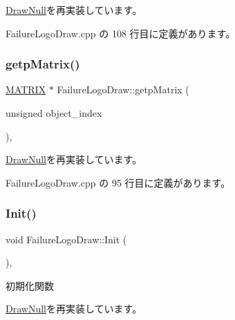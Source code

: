 \mbox{\hyperlink{class_draw_null_aa07d7e89e723b68ec257da0f63d43f70}{Draw\+Null}}を再実装しています。



 Failure\+Logo\+Draw.\+cpp の 108 行目に定義があります。

\mbox{\label{class_failure_logo_draw_a6e6fb80dc21af9318d659bc3fa71c0b5}} 
\subsubsection{\texorpdfstring{getp\+Matrix()}{getpMatrix()}}
{\footnotesize\ttfamily \mbox{\hyperlink{_vector3_d_8h_a032295cd9fb1b711757c90667278e744}{M\+A\+T\+R\+IX}} $\ast$ Failure\+Logo\+Draw\+::getp\+Matrix (\begin{DoxyParamCaption}\item[{unsigned}]{object\+\_\+index }\end{DoxyParamCaption})\hspace{0.3cm}{\ttfamily [override]}, {\ttfamily [virtual]}}



\mbox{\hyperlink{class_draw_null_a001901c340671106a33d44b9d4aef4c4}{Draw\+Null}}を再実装しています。



 Failure\+Logo\+Draw.\+cpp の 95 行目に定義があります。

\mbox{\label{class_failure_logo_draw_a718d587edcabb1feea72153a79a65176}} 
\subsubsection{\texorpdfstring{Init()}{Init()}}
{\footnotesize\ttfamily void Failure\+Logo\+Draw\+::\+Init (\begin{DoxyParamCaption}{ }\end{DoxyParamCaption})\hspace{0.3cm}{\ttfamily [override]}, {\ttfamily [virtual]}}



初期化関数 



\mbox{\hyperlink{class_draw_null_acd7fef3ccea1da537ac9507ffbb6dd2e}{Draw\+Null}}を再実装しています。



